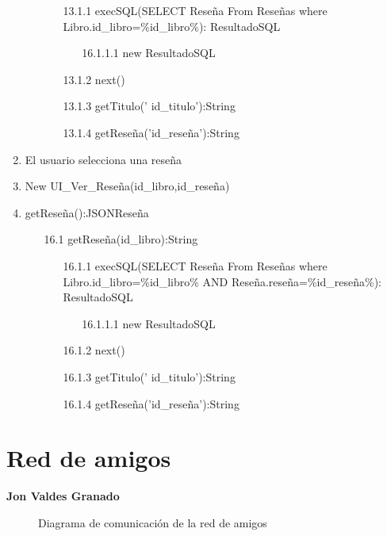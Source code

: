 ﻿\documentclass{report}
\begin{document}
\begin{enumerate}
\begin{enumerate}
                \begin{enumerate}
                    \item [13.1.1] execSQL(SELECT Reseña From Reseñas where Libro.id\_libro=\%id\_libro\%): ResultadoSQL     
                    \begin{enumerate}
                        \item [16.1.1.1] new ResultadoSQL
                    \end{enumerate}               
                    \item [13.1.2] next()
                    \item [13.1.3] getTitulo(’ id\_titulo’):String
                    \item [13.1.4] getReseña('id\_reseña'):String
                \end{enumerate}
            \end{enumerate}
            \item El usuario selecciona una reseña 
            \item New UI\_Ver\_Reseña(id\_libro,id\_reseña)
            \item getReseña():JSONReseña
            \begin{enumerate}
                \item [16.1] getReseña(id\_libro):String
                \begin{enumerate}
                    \item [16.1.1] execSQL(SELECT Reseña From Reseñas where Libro.id\_libro=\%id\_libro\% AND Reseña.reseña=\%id\_reseña\%): ResultadoSQL     
                    \begin{enumerate}
                        \item [16.1.1.1] new ResultadoSQL
                    \end{enumerate}               
                    \item [16.1.2] next()
                    \item [16.1.3] getTitulo(’ id\_titulo’):String
                    \item [16.1.4] getReseña('id\_reseña'):String
                \end{enumerate}
            \end{enumerate}                
        \end{enumerate}
        \clearpage
        \section{Red de amigos}
            \textbf{Jon Valdes Granado}
            \begin{figure}[H]
                \centering
                \caption{Diagrama de comunicación de la red de amigos}
            \end{figure}
            \clearpage
\end{document}
